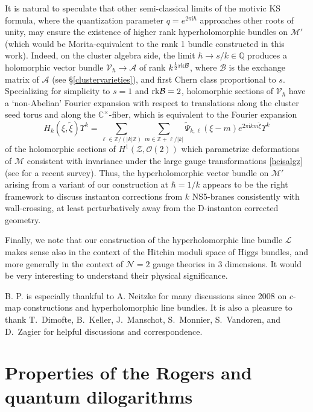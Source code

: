 \documentclass[12pt,reqno]{article}
\numberwithin{equation}{section}
\newcommand{\be}{\begin{equation}}
\newcommand{\ee}{\end{equation}}
\def\hf{\frac{1}{2}}
\newcommand{\I}{\mathrm{i}}
\newcommand{\cA}{\mathcal{A}}
\newcommand{\cB}{\mathcal{B}}
\newcommand{\cM}{\mathcal{M}}
\newcommand{\cN}{\mathcal{N}}
\newcommand{\cO}{\mathcal{O}}
\newcommand{\cZ}{\mathcal{Z}}
\newcommand{\IQ}{\mathbb{Q}}
\newcommand{\lb}{\mathscr{L}}
\newcommand{\txi}{\tilde\xi}
\def\pcM{\cM'}
\numberwithin{equation}{section}
\begin{document}
It is natural to speculate that other
semi-classical limits of the motivic KS formula, where the quantization parameter
$q=e^{2\pi\I\hbar}$ approaches other roots of unity, may ensure the existence of higher rank
hyperholomorphic bundles on $\pcM$ (which would be
Morita-equivalent to the rank 1 bundle constructed
in this work). Indeed, on the cluster algebra side, the
limit $\hbar\to s/k\in\IQ$  produces a holomorphic vector bundle
$\mathscr{V}_{\hbar}\to\cA$ of rank $k^{\hf{\rm rk}\cB}$, where $\cB$ is the exchange matrix
of $\cA$ (see \S\ref{clustervarieties}), and first Chern class proportional
to $s$. Specializing for simplicity to $s=1$ and ${\rm rk}\cB=2$,
holomorphic sections of $\mathscr{V}_{\hbar}$  have a `non-Abelian' Fourier expansion with
respect to translations along the cluster seed torus and along the $\mathbb{C}^{\times}$-fiber,
which  is equivalent to the Fourier expansion
\be
H_k(\xi, \txi)\Upsilon^{k}=\sum_{\ell\in \mathbb{Z}/(|k|\mathbb{Z})}
\sum_{m\in \mathbb{Z}+\ell/|k|} \tilde{\Psi}_{k, \ell}(\xi-m) e^{2\pi \I km\txi}\Upsilon^{k}
\label{nonabelian}
\ee
of the holomorphic sections of $H^{1}(\cZ, \cO(2))$ which parametrize
deformations of $\cM$  consistent with
invariance under the large gauge transformations
\eqref{heisalgz} \cite{Pioline:2009qt,Bao:2009fg,Bao:2010cc,Alexandrov:2010ca} (see \cite{Persson:2011xi} for a recent survey).
Thus, the hyperholomorphic vector bundle on $\pcM$ arising from a variant of our construction
at $\hbar=1/k$ appears to be the right framework to discuss instanton corrections
from $k$ NS5-branes consistently with wall-crossing, at least  perturbatively away from the D-instanton corrected geometry.




Finally, we note that our construction of the hyperholomorphic line bundle $\lb$
makes sense also in the context of the Hitchin moduli space of Higgs bundles,
and more generally in the context of
$\cN=2$ gauge theories in 3 dimensions.
 It would be very interesting to understand their
physical significance.



\acknowledgments

B. P. is especially thankful to A. Neitzke for many discussions since 2008
on $c$-map constructions and  hyperholomorphic line bundles.
It is also a pleasure to thank T.~Dimofte,
B.~Keller, J.~Manschot, S.~Monnier, S.~Vandoren, and D.~Zagier for helpful
discussions and correspondence.

\appendix

\section{Properties of the Rogers and quantum dilogarithms}
\label{sec_enhrog}
\end{document}
